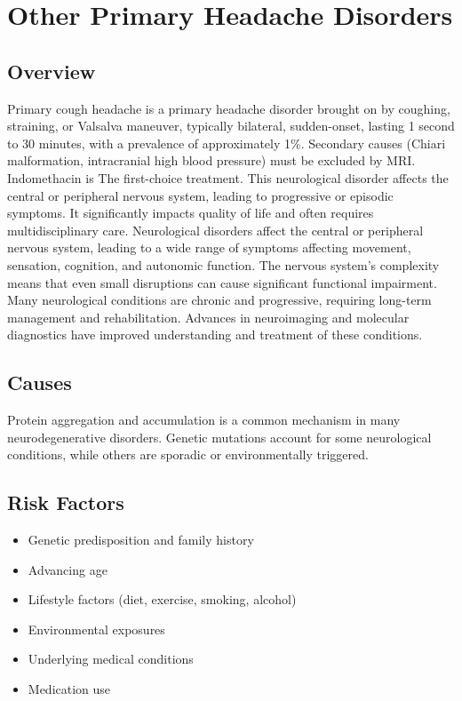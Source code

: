 \chapter{Other Primary Headache Disorders}
\label{sec:Other Primary Headache Disorders}

\section{Overview}
Primary cough headache is a primary headache disorder brought on by coughing, straining, or Valsalva maneuver, typically bilateral, sudden-onset, lasting 1 second to 30 minutes, with a prevalence of approximately 1\%. Secondary causes (Chiari malformation, intracranial high blood pressure) must be excluded by MRI. Indomethacin is The first-choice treatment. This neurological disorder affects the central or peripheral nervous system, leading to progressive or episodic symptoms. It significantly impacts quality of life and often requires multidisciplinary care. Neurological disorders affect the central or peripheral nervous system, leading to a wide range of symptoms affecting movement, sensation, cognition, and autonomic function. The nervous system's complexity means that even small disruptions can cause significant functional impairment. Many neurological conditions are chronic and progressive, requiring long-term management and rehabilitation. Advances in neuroimaging and molecular diagnostics have improved understanding and treatment of these conditions.
\section{Causes}
Protein aggregation and accumulation is a common mechanism in many neurodegenerative disorders.  Genetic mutations account for some neurological conditions, while others are sporadic or environmentally triggered.   
\section{Risk Factors}
\begin{itemize}[noitemsep]
  \item Genetic predisposition and family history
  \item Advancing age
  \item Lifestyle factors (diet, exercise, smoking, alcohol)
  \item Environmental exposures
  \item Underlying medical conditions
  \item Medication use
\end{itemize}
